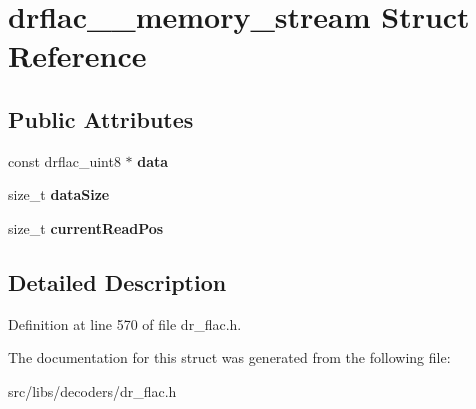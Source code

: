 \hypertarget{structdrflac____memory__stream}{\section{drflac\-\_\-\-\_\-memory\-\_\-stream Struct Reference}
\label{structdrflac____memory__stream}
}
\subsection*{Public Attributes}
\begin{DoxyCompactItemize}
\item 
\hypertarget{structdrflac____memory__stream_afa43ca3e8c704c01f4799a23901a7c0b}{const drflac\-\_\-uint8 $\ast$ {\bfseries data}}\label{structdrflac____memory__stream_afa43ca3e8c704c01f4799a23901a7c0b}

\item 
\hypertarget{structdrflac____memory__stream_ae8c8f2854e22aed1fbaa9596171232ce}{size\-\_\-t {\bfseries data\-Size}}\label{structdrflac____memory__stream_ae8c8f2854e22aed1fbaa9596171232ce}

\item 
\hypertarget{structdrflac____memory__stream_a7d9fbb8e7dc9c152825ded3efcc45dbe}{size\-\_\-t {\bfseries current\-Read\-Pos}}\label{structdrflac____memory__stream_a7d9fbb8e7dc9c152825ded3efcc45dbe}

\end{DoxyCompactItemize}


\subsection{Detailed Description}


Definition at line 570 of file dr\-\_\-flac.\-h.



The documentation for this struct was generated from the following file\-:\begin{DoxyCompactItemize}
\item 
src/libs/decoders/dr\-\_\-flac.\-h\end{DoxyCompactItemize}

